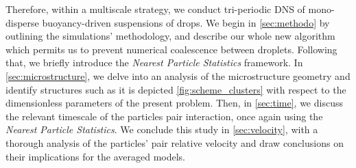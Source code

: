 Therefore, within a multiscale strategy, we conduct tri-periodic DNS of mono-disperse buoyancy-driven suspensions of drops. 
We begin in \ref{sec:methodo} by outlining the simulations' methodology, and describe our whole new algorithm which permits us to prevent numerical coalescence between droplets. 
Following that, we briefly introduce the \textit{Nearest Particle Statistics} framework. 
In \ref{sec:microstructure}, we delve into an analysis of the microstructure geometry and identify structures such as it is depicted \ref{fig:scheme_clusters} with respect to the dimensionless parameters of the present problem. 
Then, in \ref{sec:time}, we discuss the relevant timescale of the particles pair interaction, once again using the \textit{Nearest Particle Statistics}. 
We conclude this study in \ref{sec:velocity}, with a thorough analysis of the particles' pair relative velocity and draw conclusions on their implications for the averaged models.
 
